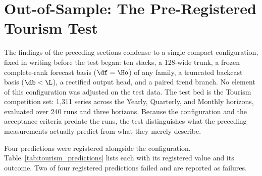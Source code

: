 
\section{Out-of-Sample: The Pre-Registered Tourism Test}\label{sec:tourism}

The findings of the preceding sections condense to a single compact configuration,
fixed in writing before the test began: ten stacks, a 128-wide trunk, a frozen
complete-rank forecast basis ($\df = \Ho$) of any family, a truncated backcast basis
($\db < \L$), a rectified output head, and a paired trend branch. No element of this
configuration was adjusted on the test data. The test bed is the Tourism competition
set: 1{,}311 series across the Yearly, Quarterly, and Monthly horizons, evaluated over
240 runs and three horizons. Because the configuration and the acceptance criteria
predate the runs, the test distinguishes what the preceding measurements actually
predict from what they merely describe.

Four predictions were registered alongside the configuration.
Table~\ref{tab:tourism_predictions} lists each with its registered value and its
outcome. Two of four registered predictions failed and are reported as failures.

